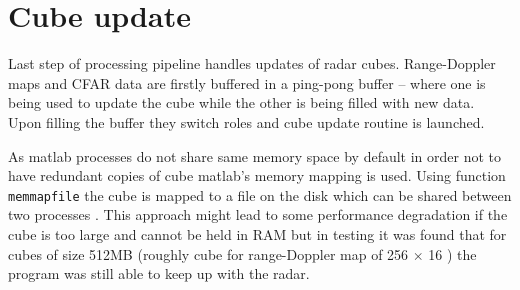\section{Cube update}

Last step of processing pipeline handles updates of radar cubes.
Range-Doppler maps and CFAR data are firstly buffered in a ping-pong buffer -- where one is being used to update the cube while the other is being filled with new data.
Upon filling the buffer they switch roles and cube update routine is launched.

As matlab processes do not share same memory space by default in order not to have redundant copies of cube matlab's memory mapping is used.
Using function \texttt{memmapfile} the cube is mapped to a file on the disk which can be shared between two processes \cite{matlab_memory}.
This approach might lead to some performance degradation if the cube is too large and cannot be held in RAM but in testing it was found that for cubes of size 512MB (roughly cube for range-Doppler map of 256 $\times$ 16 ) the program was still able to keep up with the radar.


